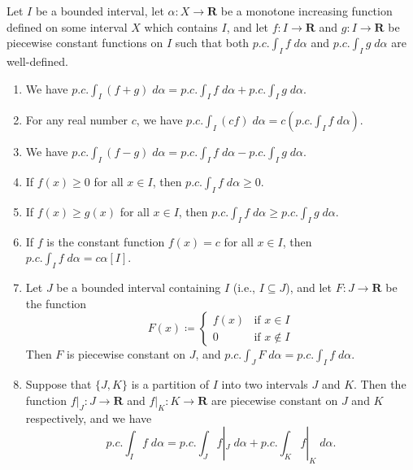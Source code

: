 \begin{additional corollary}\label{ac 11.8.6}
Let \(I\) be a bounded interval, let \(\alpha : X \to \mathbf{R}\) be a monotone increasing function defined on some interval \(X\) which contains \(I\), and let \(f : I \to \mathbf{R}\) and \(g : I \to \mathbf{R}\) be piecewise constant functions on \(I\) such that both \(p.c. \int_I f \; d \alpha\) and \(p.c. \int_I g \; d \alpha\) are well-defined.
\begin{enumerate}
    \item We have \(p.c. \int_I (f + g) \; d \alpha = p.c. \int_I f \; d \alpha + p.c. \int_I g \; d \alpha\).
    \item For any real number \(c\), we have \(p.c. \int_I (cf) \; d \alpha = c (p.c. \int_I f \; d \alpha)\).
    \item We have \(p.c. \int_I (f - g) \; d \alpha = p.c. \int_I f \; d \alpha - p.c. \int_I g \; d \alpha\).
    \item If \(f(x) \geq 0\) for all \(x \in I\), then \(p.c. \int_I f \; d \alpha \geq 0\).
    \item If \(f(x) \geq g(x)\) for all \(x \in I\), then \(p.c. \int_I f \; d \alpha \geq p.c. \int_I g \; d \alpha\).
    \item If \(f\) is the constant function \(f(x) = c\) for all \(x \in I\), then \(p.c. \int_I f \; d \alpha = c \alpha[I]\).
    \item Let \(J\) be a bounded interval containing \(I\) (i.e., \(I \subseteq J\)), and let \(F : J \to \mathbf{R}\) be the function
          \[
              F(x) \coloneqq \begin{cases}
                  f(x) & \text{if } x \in I    \\
                  0    & \text{if } x \notin I
              \end{cases}
          \]
          Then \(F\) is piecewise constant on \(J\), and \(p.c. \int_J F \; d \alpha = p.c. \int_I f \; d \alpha\).
    \item Suppose that \(\{J, K\}\) is a partition of \(I\) into two intervals \(J\) and \(K\).
          Then the function \(f|_J : J \to \mathbf{R}\) and \(f|_K : K \to \mathbf{R}\) are piecewise constant on \(J\) and \(K\) respectively, and we have
          \[
              p.c. \int_I f \; d \alpha = p.c. \int_J f|_J \; d \alpha + p.c. \int_K f|_K \; d \alpha.
          \]
\end{enumerate}
\end{additional corollary}


